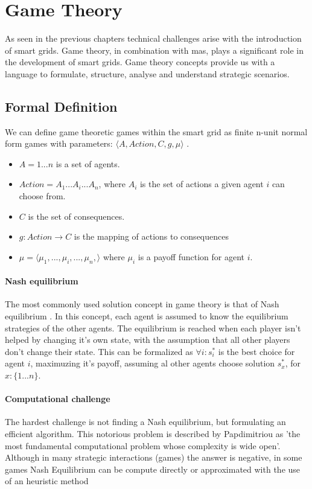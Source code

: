 \section{Game Theory}
As seen in the previous chapters technical challenges arise with the introduction of smart grids. Game theory, in combination with \gls{mas}, plays a significant role in the development of smart grids. Game theory concepts provide us with a language to formulate, structure, analyse and understand strategic scenarios.

\subsection{Formal Definition}
We can define game theoretic games within the smart grid as finite n-unit normal form games with parameters: $\langle A,Action,C,g,\mu \rangle$ \cite{CourseInGameTheory}. \\
\begin{itemize}
    \item $A = {1 ... n }$ is a set of agents.
    \item $Action = A_{1} ... A_{i} ... A_{n}$, where $A_{i}$ is the set of actions a given agent $i$ can choose from.
    \item $C$ is the set of consequences.
    \item $g: Action \to C$ is the mapping of actions to consequences
    \item $\mu = \langle \mu_{1}, ..., \mu_{i}, ..., \mu_{n}, \rangle $ where $\mu_{i}$ is a payoff function for agent $i$.
\end{itemize}


\paragraph{Nash equilibrium} 
The most commonly used solution concept in game theory is that of Nash equilibrium \cite{CourseInGameTheory}. In this concept, each agent is assumed to know the equilibrium strategies of the other agents. The equilibrium is reached when each player isn't helped by changing it's own state, with the assumption that all other players don't change their state. 
This can be formalized as $\forall i: s^{*}_{i}$ is the best choice for agent $i$, maximuzing it's payoff, assuming al other agents choose solution $s^{*}_{x}$, for $x : \{1...n\}$. 

\paragraph{Computational challenge}
The hardest challenge is not finding a Nash equilibrium, but formulating an efficient algorithm. This notorious problem is described by Papdimitriou as 'the most fundamental computational problem whose complexity is wide open'\cite{daskalakis2009complexity}. Although in many strategic interactions (games) the answer is negative, in some games Nash Equilibrium can be compute directly or approximated with the use of an heuristic method\cite{MicrogridModellingPetrosAristidou,AumannGameTheoryAccomplish} 


